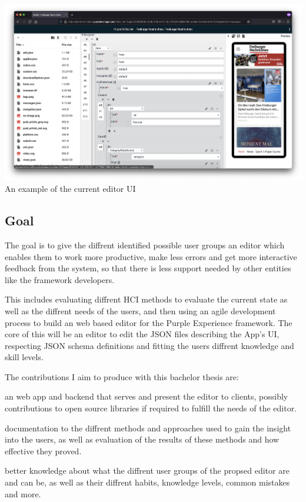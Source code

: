 \includegraphics[width=\textwidth]{pics/current_editor.png}
An example of the current editor UI

\subsection{Goal}
\label{subsec:goal}
The goal is to give the diffrent identified possible user groups an editor
which enables them to work more productive, make less errors and get more interactive feedback from the system,
so that there is less support needed by other entities like the framework developers.

This includes evaluating diffrent HCI methods to evaluate the current state as well as the diffrent needs of the users,
and then using an agile development process to build an web based editor for the Purple Experience framework.
The core of this will be an editor to edit the JSON files describing the App's UI, respecting JSON schema definitions
and fitting the users diffrent knowledge and skill levels.

The contributions I aim to produce with this bachelor thesis are:

\begin{description}[leftmargin=10em,style=nextline]
  \item[software] an web app and backend that serves and present the editor to clients, possibly contributions to open source libraries if required to fulfill the needs of the editor.
  \item[HCI discoveries] documentation to the diffrent methods and approaches used to gain the insight into the users, as well as evaluation of the results of these methods and how effective they proved.
  \item[user base knowledge] better knowledge about what the diffrent user groups of the propsed editor are and can be, as well as their diffrent habits, knowledge levels, common mistakes and more.
\end{description}

